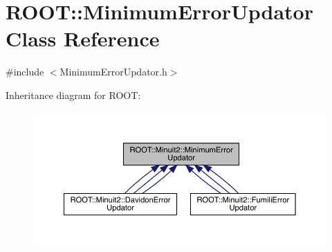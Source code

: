 \hypertarget{classROOT_1_1Minuit2_1_1MinimumErrorUpdator}{}\section{R\+O\+OT\+:\+:Minimum\+Error\+Updator Class Reference}
\label{classROOT_1_1Minuit2_1_1MinimumErrorUpdator}


{\ttfamily \#include $<$Minimum\+Error\+Updator.\+h$>$}



Inheritance diagram for R\+O\+OT\+:
\nopagebreak
\begin{figure}[H]
\begin{center}
\leavevmode
\includegraphics[width=350pt]{d2/d43/classROOT_1_1Minuit2_1_1MinimumErrorUpdator__inherit__graph}
\end{center}
\end{figure}
